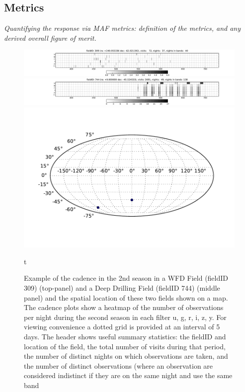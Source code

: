 






\subsection{Metrics}
\label{sec:\secname:metrics}

{\it Quantifying the response via MAF metrics: definition of the metrics,
and any derived overall figure of merit.}

\begin{figure}
 \centering
 \includegraphics[width=\textwidth]{figs/supernova/fig_309_2ndYear}
 \includegraphics[width=\textwidth]{figs/supernova/fig_744_2ndYear}
 \includegraphics[height=0.2\textheight]{figs/supernova/loc_309_744.pdf}
 \label{fig:SN_sampling}
 \caption{Example of the cadence in the 2nd season in a WFD Field (fieldID 309) (top-panel) and a Deep Drilling Field (fieldID 744) (middle panel) and the
     spatial location of these two fields shown on a map. The cadence plots show a heatmap of the number of observations per night during the second season in each filter u, g, r, i, z, y. For viewing convenience a dotted grid is provided at an interval of 5 days. The header shows useful summary statistics:
 the fieldID and location of the field, the total number of visits during that period, the number of distinct nights on which observations are taken, and the number of distinct observations (where an observation are considered indistinct if they are on the same night and use the same band}
t
\end{figure}

